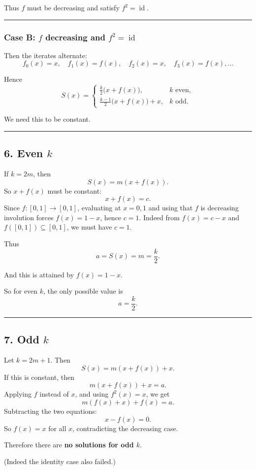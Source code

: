 \documentclass[12pt,a4paper]{article}
\begin{document}
Thus \(f\) must be decreasing and satisfy \(f^2=\operatorname{id}\).


\medskip\hrule\medskip


\subsubsection*{Case B: \(f\) decreasing and \(f^2=\operatorname{id}\)}

Then the iterates alternate:
\[
f_0(x)=x,\quad f_1(x)=f(x),\quad f_2(x)=x,\quad f_3(x)=f(x),\dots
\]

Hence
\[
S(x)=
\begin{cases}
\frac{k}{2}\bigl(x+f(x)\bigr), & k \text{ even},\\[4pt]
\frac{k-1}{2}\bigl(x+f(x)\bigr)+x, & k \text{ odd}.
\end{cases}
\]

We need this to be constant.


\medskip\hrule\medskip


\subsection*{6. Even \(k\)}

If \(k=2m\), then
\[
S(x)=m(x+f(x)).
\]
So \(x+f(x)\) must be constant:
\[
x+f(x)=c.
\]
Since \(f:[0,1]\to[0,1]\), evaluating at \(x=0,1\) and using that \(f\) is decreasing involution forces \(f(x)=1-x\), hence \(c=1\). Indeed from \(f(x)=c-x\) and \(f([0,1])\subseteq[0,1]\), we must have \(c=1\).

Thus
\[
a=S(x)=m=\frac{k}{2}.
\]

And this is attained by \(f(x)=1-x\).

So for even \(k\), the only possible value is
\[
a=\frac{k}{2}.
\]


\medskip\hrule\medskip


\subsection*{7. Odd \(k\)}

Let \(k=2m+1\). Then
\[
S(x)=m(x+f(x))+x.
\]
If this is constant, then
\[
m(x+f(x))+x=a.
\]
Applying \(f\) instead of \(x\), and using \(f^2(x)=x\), we get
\[
m(f(x)+x)+f(x)=a.
\]
Subtracting the two equations:
\[
x-f(x)=0.
\]
So \(f(x)=x\) for all \(x\), contradicting the decreasing case.

Therefore there are \textbf{no solutions for odd \(k\)}.

(Indeed the identity case also failed.)
\end{document}
